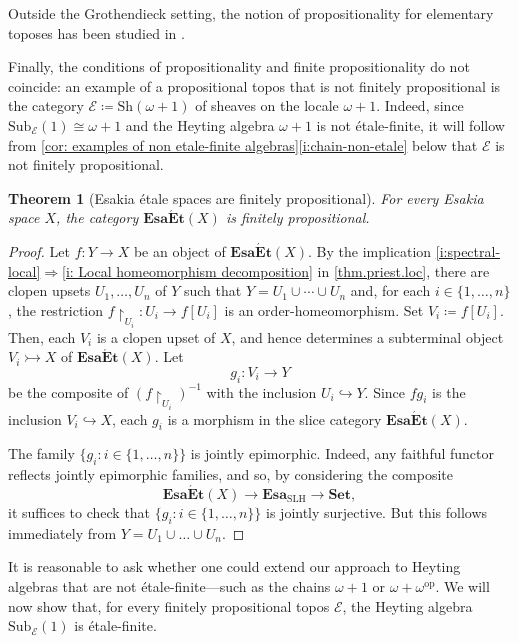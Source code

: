 \documentclass[12pt]{amsart}
\theoremstyle{plain}
\newtheorem{theorem}{Theorem}[section]
\theoremstyle{definition}
\newcommand{\cat}[1]{\mathbf{#1}}
\newcommand{\op}{\mathrm{op}}
\newcommand{\E}{\mathcal{E}}
\newcommand{\Esa}{\cat{Esa}}
\newcommand{\SLH}{\mathrm{SLH}}
\newcommand{\Sub}{\mathrm{Sub}}
\newcommand{\EsaEt}{\cat{Esa\acute{E}t}}
\begin{document}
Outside the Grothendieck setting, the notion of propositionality for elementary
toposes has been studied in \cite{kenney}.

Finally, the conditions of propositionality and finite propositionality do not coincide: an example of a propositional topos that is not finitely propositional is the category $\E \coloneqq \mathrm{Sh}(\omega + 1)$ of sheaves on the locale $\omega + 1$. Indeed, since $\Sub_\E(1) \cong \omega + 1$ and the Heyting algebra $\omega + 1$ is not étale-finite, it will follow from \cref{cor: examples of non etale-finite algebras}\eqref{i:chain-non-etale} below that $\E$ is not finitely propositional.

\begin{theorem}[Esakia étale spaces are finitely propositional]\label{thm: etale-finite yield finitely propositional}
    For every Esakia space $X$, the category $\EsaEt(X)$ is finitely propositional.
\end{theorem}

\begin{proof}
    Let $f\colon Y\to X$ be an object of $\EsaEt(X)$.
    By the implication \eqref{i:spectral-local}$\Rightarrow$\eqref{i: Local homeomorphism decomposition} in \cref{thm.priest.loc}, there are clopen upsets $U_1,\dots,U_n$ of $Y$ such that $ Y = U_1\cup\cdots\cup U_n$ and, for each $i\in\{1,\dots,n\}$, the restriction $f{\restriction}_{U_i}\colon U_i \to f[U_i]$
    is an order-homeomorphism. Set $V_i \coloneqq f[U_i]$.
    Then, each $V_i$ is a clopen upset of $X$, and hence determines a subterminal object $V_i\rightarrowtail X$ of $\EsaEt(X)$. Let
    \[
        g_i\colon V_i \longrightarrow Y
    \]
    be the composite of $(f{\restriction}_{U_i})^{-1}$ with the inclusion $U_i \hookrightarrow Y$. Since $f g_i$ is the inclusion $V_i \hookrightarrow X$, each $g_i$ is a morphism in the slice category $\EsaEt(X)$.

    The family $\{ g_i : i\in\{1,\dots,n\}\}$ is jointly epimorphic. Indeed, any faithful functor reflects jointly epimorphic families, and so, by considering the composite
    \[
        \EsaEt(X) \longrightarrow \Esa_{\SLH} \longrightarrow \cat{Set},
    \]
    it suffices to check that $\{ g_i : i\in\{1,\dots,n\}\}$ is jointly surjective. But this follows immediately from $Y=U_1\cup \dots\cup U_n$.
\end{proof}

It is reasonable to ask whether one could extend our approach to Heyting algebras that are not étale-finite---such as the chains $\omega + 1$ or $\omega + \omega^\op$. We will now show that, for every finitely propositional topos $\E$, the Heyting algebra $\mathrm{Sub}_{\E}(1)$ is étale-finite.
\end{document}
